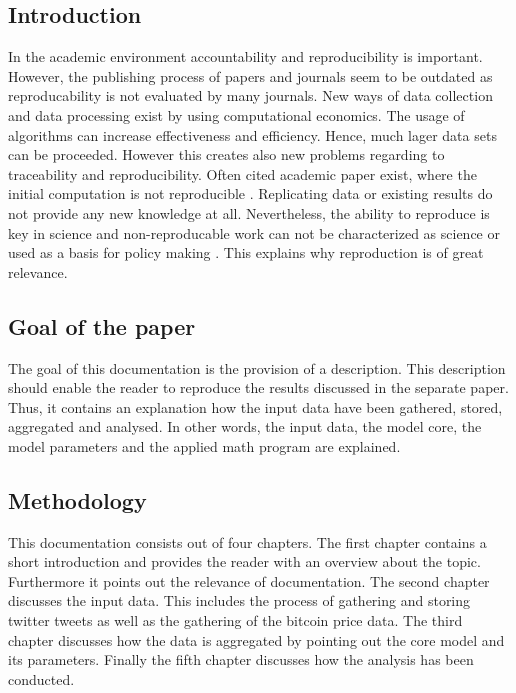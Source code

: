 \documentclass[a4paper,12pt]{article}
\begin{document}
\begin{spacing}{1.2}
\cleardoublepage{}
\section{Introduction}
In the academic environment accountability and reproducibility is important. However, the publishing process of papers and journals seem to be outdated as reproducability is not evaluated by many journals. \parencite[p.~888]{mccullough2003} New ways of data collection and data processing exist by using computational economics. The usage of algorithms can increase effectiveness and efficiency. Hence, much lager data sets can be proceeded. However this creates also new problems regarding to traceability and reproducibility. Often cited academic paper exist, where the initial computation is not reproducible \parencite[pp.~874--887]{mccullough2003}. Replicating data or existing results do not provide any new knowledge at all. Nevertheless, the ability to reproduce is key in science and non-reproducable work can not be characterized as science or used as a basis for policy making \parencite[p.~888]{mccullough2003}. This explains why reproduction is of great relevance.

\subsection{Goal of the paper}
The goal of this documentation is the provision of a description. This description should enable the reader to reproduce the results discussed in the separate paper. Thus, it contains an explanation how the input data have been gathered, stored, aggregated and analysed. In other words, the input data, the model core, the model parameters and the applied math program are explained.

\subsection{Methodology}
This documentation consists out of four chapters. The first chapter contains a short introduction and provides the reader with an overview about the topic. Furthermore it points out the relevance of documentation. The second chapter discusses the input data. This includes the process of gathering and storing twitter tweets as well as the gathering of the bitcoin price data. The third chapter discusses how the data is aggregated by pointing out the core model and its parameters. Finally the fifth chapter discusses how the analysis has been conducted.


\end{spacing}
\end{document}
